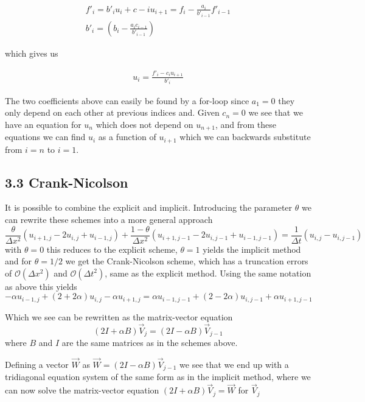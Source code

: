 \documentclass[a4paper,11pt]{report}
\begin{document}
\begin{align}
f'_i = b'_i u_i + c-i u_{i+1} = f_i - \frac{a_i}{b'_{i-1}}f'_{i-1} \\
b'_i = \left( b_i - \frac{a_i c_{i-1}}{b'_{i-1}} \right)
\end{align}

which gives us

\begin{align*}
u_{i} = \frac{f'_i - c_i u_{i+1}}{b'_i}
\end{align*}

The two coefficients above can easily be found by a for-loop since $a_1 = 0$ they only depend on each other at 
previous indices and.
Given $c_n = 0$ we see that we have an equation for $u_n$ which does not depend on $u_{n+1}$, and 
from these equations we can find $u_{i}$ as a function of $u_{i+1}$ which we can backwards substitute 
from $i=n$ to $i=1$.

\subsection*{3.3 Crank-Nicolson}

It is possible to combine the explicit and implicit. Introducing the parameter $\theta$ we can rewrite these schemes into a more general approach
\[
\frac{\theta}{\Delta x^2}(u_{i+1,j} - 2u_{i,j} + u_{i-1, j}) + \frac{1 - \theta}{\Delta x^2}(u_{i+1,j-1} - 2u_{i,j-1} + u_{i-1, j-1}) = \frac{1}{\Delta t}(u_{i,j} - u_{i, j-1})
\]
with $\theta = 0$ this reduces to the explicit scheme, $\theta = 1$ yields the implicit method and for $\theta = 1/2$ we get the Crank-Nicolson scheme, which has a truncation errors of $\mathcal{O}(\Delta x^2)$ and $\mathcal{O}(\Delta t^2)$, same as the explicit method. Using the same notation as above this yields
\begin{equation} \label{eq:CN}
-\alpha u_{i-1, j} + (2 + 2\alpha)u_{i,j} - \alpha u_{i+1, j} = \alpha u_{i-1, j-1} + (2 - 2\alpha)u_{i, j-1} + \alpha u_{i+1, j-1}
\end{equation}

Which we see can be rewritten as the matrix-vector equation 
\begin{equation}
(2I + \alpha B) \vec{V}_j = (2I - \alpha B) \vec{V}_{j-1}
\end{equation} where $B$ and $I$ are the same matrices as in the schemes above.

Defining a vector $\vec{W}$ as \( \vec{W} = (2I - \alpha B) \vec{V}_{j-1} \) we see that we end up with a tridiagonal equation system of the same form as in the implicit method, where we can now solve the matrix-vector equation \( (2I + \alpha B) \vec{V}_j = \vec{W}\) for $\vec{V}_j$
\end{document}
